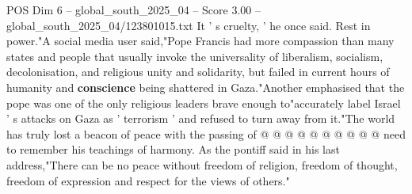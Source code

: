 \begin{textsample}{POS Dim 6 – global\_south\_2025\_04 – Score 3.00 – global\_south\_2025\_04/123801015.txt}
It ' s cruelty, ' he once said.
Rest in power."A social media user said,"Pope Francis had more compassion than many states and people that usually invoke the universality of liberalism, socialism, decolonisation, and religious unity and solidarity, but failed in current hours of humanity and \textbf{conscience} being shattered in Gaza."Another emphasised that the pope was one of the only religious leaders brave enough to"accurately label Israel ' s attacks on Gaza as ' terrorism ' and refused to turn away from it."The world has truly lost a beacon of peace with the passing of @ @ @ @ @ @ @ @ @ @ need to remember his teachings of harmony.
As the pontiff said in his last address,"There can be no peace without freedom of religion, freedom of thought, freedom of expression and respect for the views of others."

\end{textsample}

